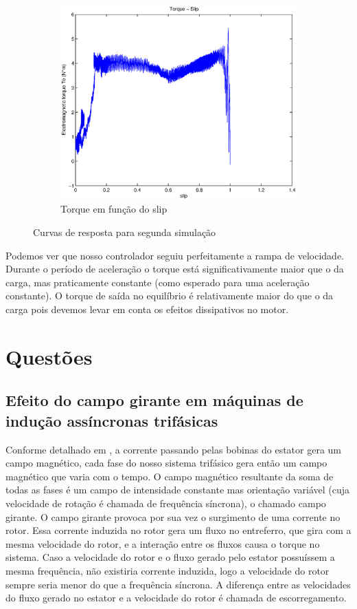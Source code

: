 \documentclass{article}
\begin{document}
\begin{figure}[H]
\begin{subfigure}[b]{0.49\linewidth}
		\centering
		\includegraphics[width=\linewidth]{matlab/ts2}
		\caption{Torque em função do slip}
	\end{subfigure}
	\caption{Curvas de resposta para segunda simulação}
	\label{fig:s2}
\end{figure}

Podemos ver que nosso controlador seguiu perfeitamente a rampa de velocidade. Durante o período de aceleração o torque está significativamente maior que o da carga, mas praticamente constante (como esperado para uma aceleração constante). O torque de saída no equilíbrio é relativamente maior do que o da carga pois devemos levar em conta os efeitos dissipativos no motor.


\section{Questões}
\subsection{Efeito do campo girante em máquinas de indução assíncronas trifásicas}
Conforme detalhado em \cite{bb:learneng}, a corrente passando pelas bobinas do estator gera um campo magnético, cada fase do nosso sistema trifásico gera então um campo magnético que varia com o tempo. O campo magnético resultante da soma de todas as fases é um campo de intensidade constante mas orientação variável (cuja velocidade de rotação é chamada de frequência síncrona), o chamado campo girante. O campo girante provoca por sua vez o surgimento de uma corrente no rotor.
Essa corrente induzida no rotor gera um fluxo no entreferro, que gira com a mesma velocidade do rotor, e a interação entre os fluxos causa o torque no sistema. Caso a velocidade do rotor e o fluxo gerado pelo estator possuíssem a mesma frequência, não existiria corrente induzida, logo a velocidade do rotor sempre seria menor do que a frequência síncrona. A diferença entre as velocidades do fluxo gerado no estator e a velocidade do rotor é chamada de escorregamento.
\end{document}
